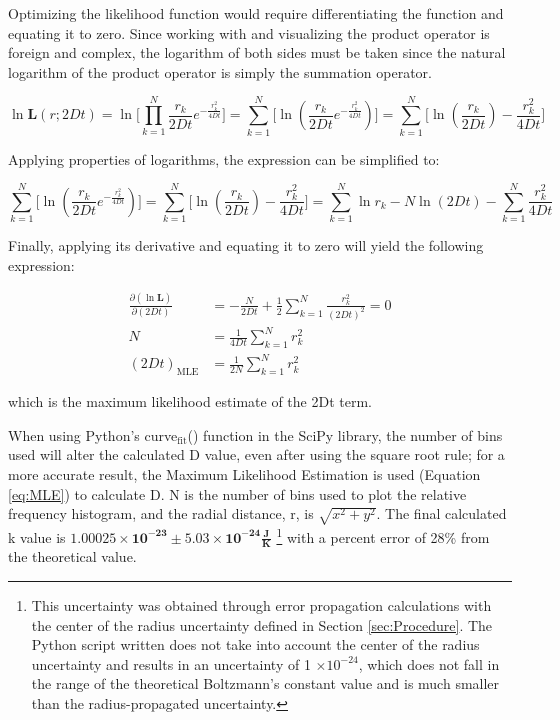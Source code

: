 \documentclass[12pt, letterpaper, twoside]{article}
\begin{document}
Optimizing the likelihood function would require differentiating the function and equating it to zero. Since working with and visualizing the product operator is foreign and complex, the logarithm of both sides must be taken since the natural logarithm of the product operator is simply the summation operator.

\begin{equation}
    \ln\textbf{L}(r;2Dt) = \ln\big[\prod_{k=1}^N\frac{r_k}{2Dt}e^{-\frac{r_k^2}{4Dt}}\big] = \sum_{k=1}^N\big[\ln(\frac{r_k}{2Dt}e^{-\frac{r_k^2}{4Dt}})\big] = \sum_{k=1}^N\big[\ln(\frac{r_k}{2Dt}) - \frac{r_k^2}{4Dt}\big]
\end{equation}

Applying properties of logarithms, the expression can be simplified to:

\begin{equation*}
    \sum_{k=1}^N\big[\ln(\frac{r_k}{2Dt}e^{-\frac{r_k^2}{4Dt}})\big] = \sum_{k=1}^N\big[\ln(\frac{r_k}{2Dt}) - \frac{r_k^2}{4Dt}\big] = \sum_{k=1}^N\ln{r_k} - N\ln(2Dt) - \sum_{k=1}^N\frac{r_k^2}{4Dt}
\end{equation*}

Finally, applying its derivative and equating it to zero will yield the following expression:

\begin{align}
    \frac{\partial (\ln\textbf{L})}{\partial(2Dt)} &= -\frac{N}{2Dt}+\frac{1}{2}\sum_{k=1}^N\frac{r_k^2}{(2Dt)^2} = 0 \\N &= \frac{1}{4Dt}\sum_{k=1}^Nr_k^2 \\ (2Dt)_{\text{MLE}} &= \frac{1}{2N}\sum_{k=1}^Nr_k^2 \label{eq:MLE}
\end{align}

which is the maximum likelihood estimate of the 2Dt term.

When using Python's curve$_\text{fit}$() function in the SciPy library, the number of bins used will alter the calculated D value, even after using the square root rule; for a more accurate result, the Maximum Likelihood Estimation is used (Equation \ref{eq:MLE}) to calculate D. N is the number of bins used to plot the relative frequency histogram, and the radial distance, r, is $\sqrt{x^2 + y^2}$. The final calculated k value is $\bm{1.00025\times 10^{-23} \pm 5.03\times 10^{-24} \frac{J}{K}}$ \footnote[2]{This uncertainty was obtained through error propagation calculations with the center of the radius uncertainty defined in Section \ref{sec:Procedure}. The Python script written does not take into account the center of the radius uncertainty and results in an uncertainty of 1 $\times 10^{-24}$, which does not fall in the range of the theoretical Boltzmann's constant value and is much smaller than the radius-propagated uncertainty.} with a percent error of 28\% from the theoretical value. 
\end{document}
